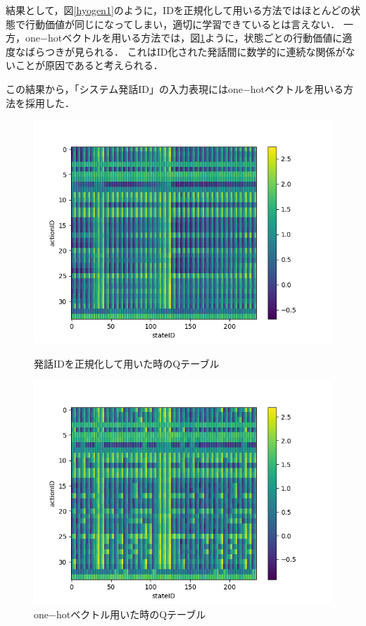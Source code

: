\documentclass[a4j,dvipdfmx]{jarticle}
\begin{document}
結果として，図\ref{hyogen1}のように，IDを正規化して用いる方法ではほとんどの状態で行動価値が同じになってしまい，適切に学習できているとは言えない．
一方，one$-$hotベクトルを用いる方法では，図\ref{hyogen2}ように，状態ごとの行動価値に適度なばらつきが見られる．
これはID化された発話間に数学的に連続な関係がないことが原因であると考えられる．

この結果から，「システム発話ID」の入力表現にはone$-$hotベクトルを用いる方法を採用した．
\begin{figure}[tb]
 \begin{minipage}{0.45\hsize}
  \begin{center}
   \includegraphics[width=\linewidth]{table_hyogen.png}
  \end{center}
  \caption{発話IDを正規化して用いた時のQテーブル}
  \label{hyogen1}
 \end{minipage}
 \begin{minipage}{0.45\hsize}
  \begin{center}
   \includegraphics[width=\linewidth]{table_DQN.png}
  \end{center}
  \caption{one$-$hotベクトル用いた時のQテーブル}
  \label{hyogen2}
 \end{minipage}
\end{figure}
\end{document}
